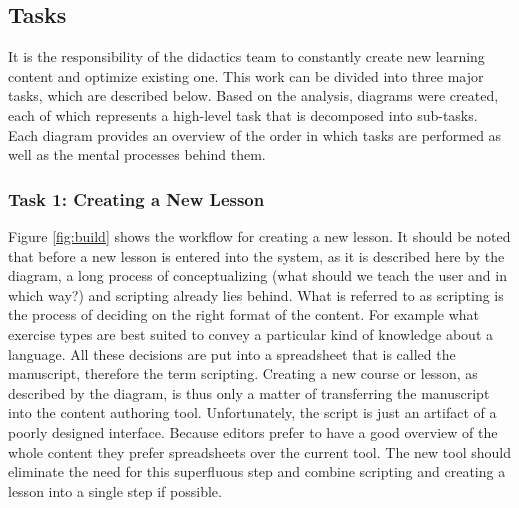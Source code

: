 \subsection{Tasks} \label{tasks}
It is the responsibility of the didactics team to constantly create new learning content and optimize existing one. This work can be divided into three major tasks, which are described below. Based on the analysis, diagrams were created, each of which represents a high-level task that is decomposed into sub-tasks. Each diagram provides an overview of the order in which tasks are performed as well as the mental processes behind them.


\subsubsection{Task 1: Creating a New Lesson} \label{sec:task1}
Figure \ref{fig:build} shows the workflow for creating a new lesson. It should be noted that before a new lesson is entered into the system, as it is described here by the diagram, a long process of conceptualizing (what should we teach the user and in which way?) and scripting already lies behind. What is referred to as scripting is the process of deciding on the right format of the content. For example what exercise types are best suited to convey a particular kind of knowledge about a language. All these decisions are put into a spreadsheet that is called the manuscript, therefore the term scripting. Creating a new course or lesson, as described by the diagram, is thus only a matter of transferring the manuscript into the content authoring tool. Unfortunately, the script is just an artifact of a poorly designed interface. Because editors prefer to have a good overview of the whole content they prefer spreadsheets over the current tool. The new tool should eliminate the need for this superfluous step and combine scripting and creating a lesson into a single step if possible.


